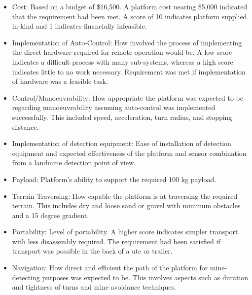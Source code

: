 \documentclass[main.tex]{subfiles}
\begin{document}
\begin{itemize}
\item Cost: Based on a budget of \$16,500. A platform cost nearing \$5,000 indicated that the requirement had been met. A score of 10 indicates platform supplied in-kind and 1 indicates financially infeasible.
\item Implementation of Auto-Control: How involved the process of implementing the direct hardware required for remote operation would be. A low score indicates a difficult process with many sub-systems, whereas a high score indicates little to no work necessary. Requirement was met if implementation of hardware was a feasible task.
\item Control/Manoeuvrability: How appropriate the platform was expected to be regarding manoeuvrability assuming auto-control was implemented successfully. This included speed, acceleration, turn radius, and stopping distance.
\item Implementation of detection equipment: Ease of installation of detection equipment and expected effectiveness of the platform and sensor combination from a landmine detection point of view.
\item Payload: Platform's ability to support the required 100 kg payload.
\item Terrain Traversing: How capable the platform is at traversing the required terrain. This includes dry and loose sand or gravel with minimum obstacles and a 15 degree gradient.
\item Portability: Level of portability. A higher score indicates simpler transport with less disassembly required. The requirement had been satisfied if transport was possible in the back of a ute or trailer.
\item Navigation: How direct and efficient the path of the platform for mine-detecting purposes was expected to be. This involves aspects such as duration and tightness of turns and mine avoidance techniques.
\end{itemize}
\end{document}
